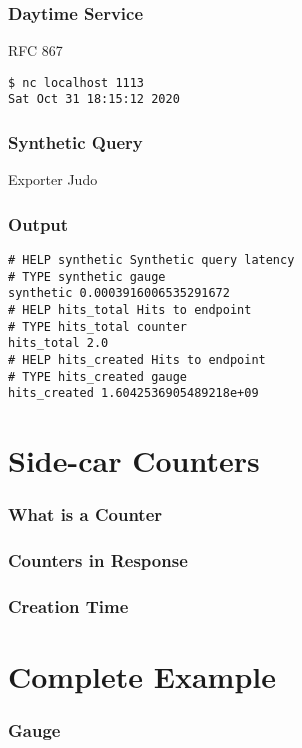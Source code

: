 \begin{frame}[fragile]
\frametitle{Daytime Service}
RFC 867\pause

\begin{lstlisting}
$ nc localhost 1113
Sat Oct 31 18:15:12 2020
\end{lstlisting}

\end{frame}

\begin{frame}[fragile]
\frametitle{Synthetic Query}
Exporter Judo\pause



\end{frame}

\begin{frame}[fragile]
\frametitle{Output}

\begin{lstlisting}
# HELP synthetic Synthetic query latency
# TYPE synthetic gauge
synthetic 0.0003916006535291672
# HELP hits_total Hits to endpoint
# TYPE hits_total counter
hits_total 2.0
# HELP hits_created Hits to endpoint
# TYPE hits_created gauge
hits_created 1.6042536905489218e+09
\end{lstlisting}

\end{frame}

\section{Side-car Counters}

\begin{frame}
\frametitle{What is a Counter}
\end{frame}

\begin{frame}
\frametitle{Counters in Response}
\end{frame}

\begin{frame}
\frametitle{Creation Time}
\end{frame}

\section{Complete Example}

\begin{frame}
\frametitle{Gauge}
\end{frame}

